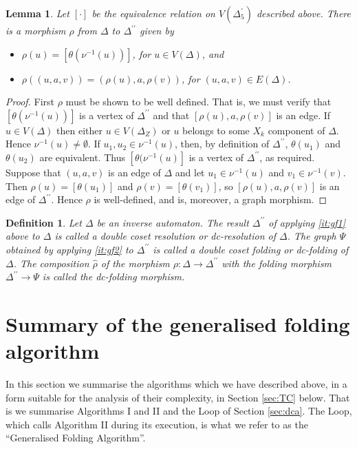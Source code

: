 \documentclass[a4paper,12pt]{article}
\newcommand{\D}{\Delta }
\renewcommand{\S}{\Sigma }
\newcommand{\nul}{\emptyset }
\newtheorem{lemma}[theorem]{Lemma}
\newtheorem{definition}[theorem]{Definition}
\numberwithin{equation}{section}
\numberwithin{figure}{section}
\newcommand{\maps}{\rightarrow}
\begin{document}
\begin{lemma}\label{lem:resol-quot}
Let $[\cdot]$ be the equivalence relation on $V(\D^\prime_5)$
described above. There is a morphism $\rho$ from  $\D$ to
$\D^{\prime\prime}$ given by
\begin{itemize}
\item
$\rho(u)=[\theta(\nu^{-1}(u))]$, for
$u\in V(\D)$, and
\item
$\rho((u,a,v))=(\rho(u),a,\rho(v))$, for $(u,a,v)\in  E(\D)$.
\end{itemize}
\end{lemma}
\begin{proof}
First $\rho$ must be shown to be well defined.
That is, we must verify that $[\theta(\nu^{-1}(u))]$ is a vertex of
$\D^{\prime\prime}$ and that $[\rho(u),a,\rho(v)]$ is an edge.
If $u \in V(\D)$
then either $u\in V(\D_Z)$ or  $u$ belongs to
some $X_k$ component of $\D$. Hence
 $\nu^{-1}(u)\neq \nul$. If $u_1, u_2\in \nu^{-1}(u)$, then,
by definition of
$\D^{\prime\prime}$, $\theta(u_1)$ and $\theta(u_2)$ are equivalent.
Thus $[\theta(\nu^{-1}(u)]$ is a vertex of $\D^{\prime\prime}$,
as required.
 Suppose that $(u,a,v)$ is an edge
of $\D$ and let $u_1\in \nu^{-1}(u)$ and $v_1\in \nu^{-1}(v)$. Then
$\rho(u)=[\theta(u_1)]$ and $\rho(v)=[\theta(v_1)]$, so
$[\rho(u), a, \rho(v)]$ is an edge of $\D^{\prime\prime}$.
Hence $\rho$ is well-defined, and is, moreover, a graph morphism.
\end{proof}


\begin{definition}
Let $\D$ be an inverse automaton.
 The result $\D^{\prime\prime}$ of applying  \ref{it:gf1}
above to $\D$ is called a \emph{double coset resolution} or
\emph{dc-resolution} of $\D$. The graph $\Psi$ obtained by applying
 \ref{it:gf2} to $\D^{\prime\prime}$ is called a \emph{double
coset folding} or \emph{dc-folding} of $\D$.  The composition $\hat\rho$ of
the  morphism
$\rho:\D\maps \D^{\prime\prime}$ with the folding morphism $\D^{\prime\prime}\maps
\Psi$ is called the \emph{dc-folding morphism}.
\end{definition}
\section{Summary of the generalised folding algorithm}
In this section we summarise the algorithms which we have described above,
in a form suitable for the analysis of their complexity,
in Section \ref{sec:TC} below. That is we summarise Algorithms I and II
and the Loop of Section \ref{sec:dca}. The Loop, which calls Algorithm II
during its execution, is what we refer to as the ``Generalised Folding
Algorithm''.
\end{document}
